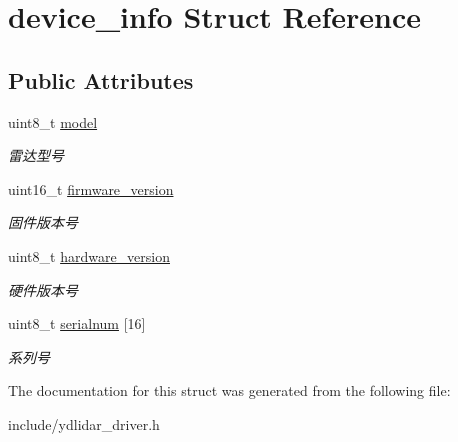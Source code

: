 \hypertarget{structdevice__info}{}\section{device\+\_\+info Struct Reference}
\label{structdevice__info}
\subsection*{Public Attributes}
\begin{DoxyCompactItemize}
\item 
uint8\+\_\+t \hyperlink{structdevice__info_a3c491b342ed11af3c70358e7e8f6c935}{model}\hypertarget{structdevice__info_a3c491b342ed11af3c70358e7e8f6c935}{}\label{structdevice__info_a3c491b342ed11af3c70358e7e8f6c935}

\begin{DoxyCompactList}\small\item\em 雷达型号 \end{DoxyCompactList}\item 
uint16\+\_\+t \hyperlink{structdevice__info_af3d369a410577d85ec6b59ffeeaade48}{firmware\+\_\+version}\hypertarget{structdevice__info_af3d369a410577d85ec6b59ffeeaade48}{}\label{structdevice__info_af3d369a410577d85ec6b59ffeeaade48}

\begin{DoxyCompactList}\small\item\em 固件版本号 \end{DoxyCompactList}\item 
uint8\+\_\+t \hyperlink{structdevice__info_add77e9b0edbc4a0dbd8f91b0cac9ea13}{hardware\+\_\+version}\hypertarget{structdevice__info_add77e9b0edbc4a0dbd8f91b0cac9ea13}{}\label{structdevice__info_add77e9b0edbc4a0dbd8f91b0cac9ea13}

\begin{DoxyCompactList}\small\item\em 硬件版本号 \end{DoxyCompactList}\item 
uint8\+\_\+t \hyperlink{structdevice__info_abf23e35480aff36d846085ca6fd0eec3}{serialnum} \mbox{[}16\mbox{]}\hypertarget{structdevice__info_abf23e35480aff36d846085ca6fd0eec3}{}\label{structdevice__info_abf23e35480aff36d846085ca6fd0eec3}

\begin{DoxyCompactList}\small\item\em 系列号 \end{DoxyCompactList}\end{DoxyCompactItemize}


The documentation for this struct was generated from the following file\+:\begin{DoxyCompactItemize}
\item 
include/ydlidar\+\_\+driver.\+h\end{DoxyCompactItemize}
